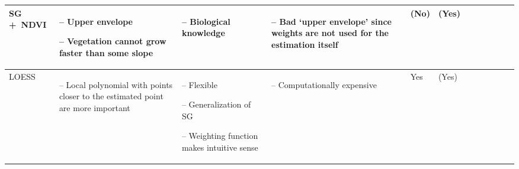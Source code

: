 \begin{table}[!ht]
\begin{tabular}{p{1.6cm}p{3.3cm}p{3.3cm}p{3.4cm}p{0.4cm}p{0.4cm}p{3cm}p{3cm}p{3cm}p{3cm}p{2.7cm}p{3cm}|}
		SG +~NDVI                                                                                                                                                    &
		\begin{cptitemize} \item[--]  Upper envelope \item[--]  Vegetation cannot grow faster than some slope                                \end{cptitemize}        &
		\begin{cptitemize} \item[--]  Biological knowledge                                                                            \end{cptitemize}               &
		\begin{cptitemize} \item[--]  Bad `upper envelope' since weights are not used for the estimation itself                    \end{cptitemize}               &
		(No)                                                                                                                                                         &
		(Yes)                                                                                                                                                         \\ \hline%

		LOESS                                                                                                                                                        &
		\begin{cptitemize} \item[--]  Local  polynomial with points closer to the estimated point are more important                  \end{cptitemize}               &
		\begin{cptitemize} \item[--]  Flexible \item[--]  Generalization of SG \item[--]  Weighting function makes intuitive sense                  \end{cptitemize} &
		\begin{cptitemize} \item[--]  Computationally expensive                                                                       \end{cptitemize}               &
		Yes                                                                                                                                                          &
		(Yes)                                                                                                                                                         \\ \hline%


\end{tabular}
\end{table}
